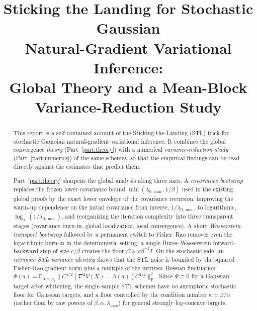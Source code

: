 \documentclass[11pt]{article}
\title{Sticking the Landing for Stochastic Gaussian\\
Natural-Gradient Variational Inference:\\
Global Theory and a Mean-Block Variance-Reduction Study}
\author{}
\date{}
\theoremstyle{plain}
\theoremstyle{definition}
\theoremstyle{remark}
\newcommand{\E}{\mathbb{E}}
\newcommand{\Id}{I}
\newcommand{\Frob}{\mathrm{F}}
\newcommand{\logp}{\log_+}
\begin{document}
\maketitle

\begin{abstract}
This report is a self-contained account of the Sticking-the-Landing (STL) trick for
stochastic Gaussian natural-gradient variational inference. It combines the global
convergence \emph{theory} (Part~\ref{part:theory}) with a numerical
\emph{variance-reduction study} (Part~\ref{part:numerics}) of the same schemes, so that
the empirical findings can be read directly against the estimates that predict them.

Part~\ref{part:theory} sharpens the global analysis along three axes. A \emph{covariance
bootstrap} replaces the frozen lower covariance bound $\min(\lambda_{0,\min},1/\beta)$ used
in the existing global proofs by the exact lower envelope of the covariance recursion,
improving the warm-up dependence on the initial covariance from inverse,
$1/\lambda_{0,\min}$, to logarithmic, $\logp(1/\lambda_{0,\min})$, and reorganizing the
iteration complexity into three transparent stages (covariance burn-in, global
localization, local convergence). A short \emph{Wasserstein transport bootstrap} followed
by a permanent switch to Fisher--Rao removes even the logarithmic burn-in in the
deterministic setting: a single Bures--Wasserstein forward--backward step of size $c/\beta$
creates the floor $C\succeq c\beta^{-1}\Id$. On the stochastic side, an \emph{intrinsic STL
variance identity} shows that the STL noise is bounded by the squared Fisher--Rao gradient
norm plus a multiple of the intrinsic Hessian fluctuation
$\Psi(a)=\E_{X\sim\rho_a}\|C^{1/2}(\nabla^2V(X)-A(a))C^{1/2}\|_{\Frob}^2$. Since
$\Psi\equiv0$ for a Gaussian target after whitening, the single-sample STL schemes have
\emph{no} asymptotic stochastic floor for Gaussian targets, and a floor controlled by the
condition number $\kappa=\beta/\alpha$ (rather than by raw powers of
$\beta,\alpha,\lambda_{\max}$) for general strongly log-concave targets.


\end{abstract}
\end{document}
